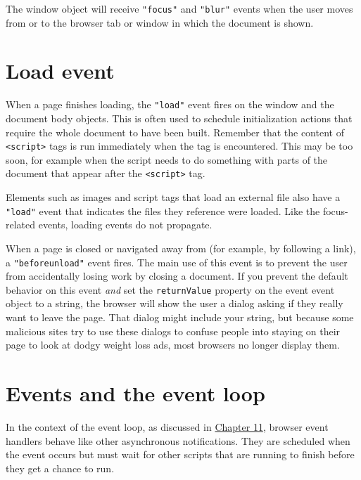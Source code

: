 The window object will receive \lstinline`"focus"` and \lstinline`"blur"` events when the user moves from or to the browser tab or window in which the document is shown.

\section{Load event}

When a page finishes loading, the \lstinline`"load"` event fires on the window and the document body objects. This is often used to schedule initialization actions that require the whole document to have been built. Remember that the content of \lstinline`<script>` tags is run immediately when the tag is encountered. This may be too soon, for example when the script needs to do something with parts of the document that appear after the \lstinline`<script>` tag.

Elements such as images and script tags that load an external file also have a \lstinline`"load"` event that indicates the files they reference were loaded. Like the focus-related events, loading events do not propagate.

When a page is closed or navigated away from (for example, by following a link), a \lstinline`"beforeunload"` event fires. The main use of this event is to prevent the user from accidentally losing work by closing a document. If you prevent the default behavior on this event \emph{and} set the \lstinline`returnValue` property on the event event object to a string, the browser will show the user a dialog asking if they really want to leave the page. That dialog might include your string, but because some malicious sites try to use these dialogs to confuse people into staying on their page to look at dodgy weight loss ads, most browsers no longer display them.

\label{event.timeline}\section{Events and the event loop}

In the context of the event loop, as discussed in \hyperref[async]{Chapter 11}, browser event handlers behave like other asynchronous notifications. They are scheduled when the event occurs but must wait for other scripts that are running to finish before they get a chance to run.

